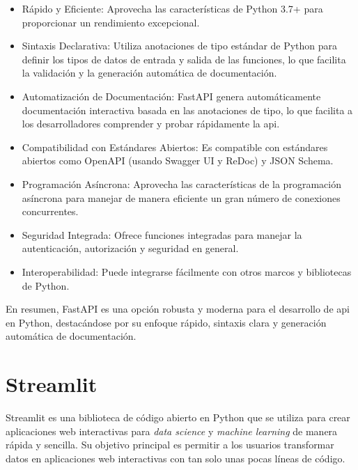 \begin{itemize}

\item Rápido y Eficiente: Aprovecha las características de Python 3.7+ para proporcionar un rendimiento excepcional.

\item Sintaxis Declarativa: Utiliza anotaciones de tipo estándar de Python para definir los tipos de datos de entrada y salida de las funciones, lo que facilita la validación y la generación automática de documentación.

\item Automatización de Documentación: FastAPI genera automáticamente documentación interactiva basada en las anotaciones de tipo, lo que facilita a los desarrolladores comprender y probar rápidamente la \acrshort{api}.

\item Compatibilidad con Estándares Abiertos: Es compatible con estándares abiertos como OpenAPI (usando Swagger UI y ReDoc) y JSON Schema.

\item Programación Asíncrona: Aprovecha las características de la programación asíncrona para manejar de manera eficiente un gran número de conexiones concurrentes.

\item Seguridad Integrada: Ofrece funciones integradas para manejar la autenticación, autorización y seguridad en general.

\item Interoperabilidad: Puede integrarse fácilmente con otros marcos y bibliotecas de Python.

\end{itemize}

En resumen, FastAPI es una opción robusta y moderna para el desarrollo de \acrshort{api} en Python, destacándose por su enfoque rápido, sintaxis clara y generación automática de documentación.

\section{Streamlit}

Streamlit es una biblioteca de código abierto en Python que se utiliza para crear aplicaciones web interactivas para \textit{data science} y \textit{machine learning} de manera rápida y sencilla. Su objetivo principal es permitir a los usuarios transformar datos en aplicaciones web interactivas con tan solo unas pocas líneas de código.

